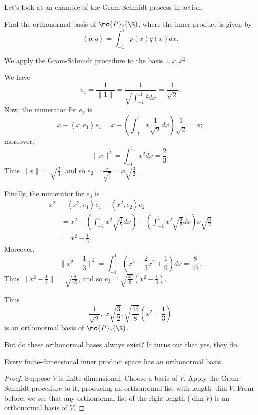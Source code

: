 \documentclass[math0540-lecture-notes.tex]{subfiles}
\begin{document}
Let's look at an example of the Gram-Schmidt process in action.
\begin{example}
  Find the orthonormal basis of $\mc{P}_2(\R)$, where the inner product is given by \[
    \left<p,q \right>=\int_{-1}^{1}p(x)q(x)dx
  .\] 
\end{example}
\begin{solution}
  We apply the Gram-Schmidt procedure to the basis $1,x,x^2$.

  We have \[
    e_1=\frac{1}{\|1\|}=\frac{1}{\sqrt{\int_{-1}^11^2dx}}=\frac{1}{\sqrt{2}}
  .\] Now, the numerator for $e_2$ is \[
  x-\left<x,e_1 \right>e_1=x-\left( \int_{-1}^1x\frac{1}{\sqrt{2}}dx \right)\frac{1}{\sqrt{2}}=x
  ;\] moreover, \[
    \|x\|^2=\int_{-1}^1x^2dx=\frac{2}{3}
  .\] Thus $\|x\|=\sqrt{\frac{2}{3}}$, and so
  $e_2=\frac{x}{\sqrt{\frac{2}{3}}}=x\sqrt{\frac{3}{2}}$.

  Finally, the numerator for $e_3$ is
  \begin{align*}
    x^2&-\left<x^2,e_1 \right>e_1-\left<x^2,e_2 \right>e_2\\
       &= x^2-\left( \int_{-1}^1x^2\sqrt{\frac{1}{2}}dx\right)-\left(
       \int_{-1}^1x^2\sqrt{\frac{3}{2}}dx \right) x\sqrt{\frac{3}{2}}\\
       &= x^2-\frac{1}{3}
  .\end{align*}
  Moreover, \[
    \|x^2-\frac{1}{3}\|^2=\int_{-1}^1(x^4-\frac{2}{3}x^2+\frac{1}{9})dx=\frac{8}{45}
  .\] Thus $\|x^2-\frac{1}{3}\|=\sqrt{\frac{8}{45}}$, and so
  $e_3=\sqrt{\frac{45}{8}}(x^2-\frac{1}{3})$.

  Thus \[
    \frac{1}{\sqrt{2}},\ x\sqrt{\frac{3}{2}},\sqrt{\frac{45}{8}}(x^2-\frac{1}{3})
  \] is an orthonormal basis of $\mc{P}_2(\R)$.
\end{solution}

But do these orthonormal bases always exist? It turns out that yes, they do.
\begin{proposition}{}
  Every finite-dimensional inner product space has an orthonormal basis.
\end{proposition}
\begin{proof}[Proof]
  Suppose $V$ is finite-dimensional. Choose a basis of $V$. Apply the Gram-Schmidt procedure to it,
  producing an orthonormal list with length $\dim{V}$. From before, we see that any orthonormal list
  of the right length ($\dim{V}$) is an orthonormal basis of $V$.
\end{proof}
\end{document}
